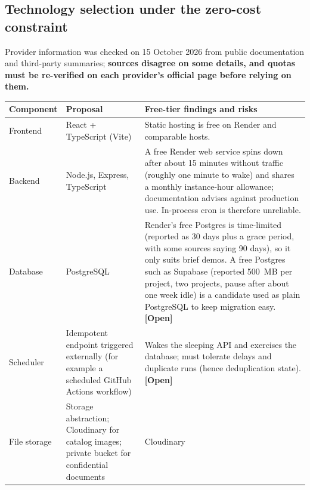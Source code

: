 \documentclass[11pt,a4paper]{article}
\newcommand{\code}[1]{\texttt{\detokenize{#1}}}
\newcommand{\tagopen}{\textcolor{red!70!black}{\textbf{[Open]}}}
\begin{document}
\subsection{Technology selection under the zero-cost constraint}

Provider information was checked on 15 October 2026 from public documentation
and third-party summaries; \textbf{sources disagree on some details, and quotas
	must be re-verified on each provider's official page before relying on them.}

\begin{longtable}{@{}L{2.4cm}L{3.6cm}L{9.8cm}@{}}
	\toprule
	\textbf{Component}                                            &
	\textbf{Proposal}
	                                                              &
	\textbf{Free-tier findings and
		risks}
	\\
	\midrule
	\endhead
	Frontend                                                      & React +
	TypeScript (Vite)
	                                                              & Static hosting
	is free on Render and comparable hosts.
	\\
	Backend                                                       & Node.js,
	Express, TypeScript
	                                                              & A free Render
	web service spins down after about 15 minutes without traffic
	(roughly one minute to wake) and shares a monthly instance-hour allowance;
	documentation advises against production use. In-process cron is therefore
	unreliable.
	\\
	Database                                                      & PostgreSQL
	                                                              & Render's free
	Postgres is time-limited (reported as 30 days plus a grace
	period, with some sources saying 90 days), so it only suits brief demos. A
	free
	Postgres such as Supabase (reported 500~MB per project, two projects, pause
	after about one week idle) is a candidate used as plain PostgreSQL to keep
	migration easy. \tagopen{}
	\\
	Scheduler                                                     & Idempotent
	\code{tick} endpoint triggered externally (for
	example a scheduled GitHub Actions workflow)                  & Wakes the
	sleeping API and
	exercises the database; must tolerate delays and duplicate runs (hence
	deduplication state). \tagopen{}
	\\
	File storage                                                  & Storage
	abstraction; Cloudinary
	for catalog images; private bucket for confidential documents & Cloudinary

\end{longtable}
\end{document}
